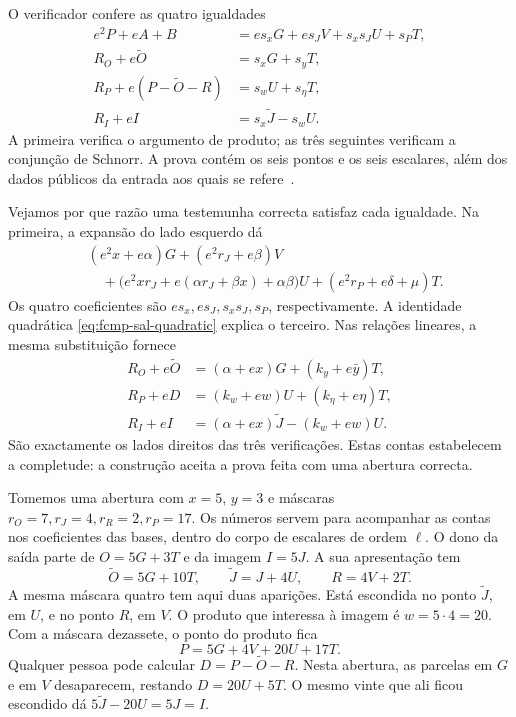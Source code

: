 O verificador confere as quatro igualdades
\begin{subequations}
\label{eq:fcmp-sal-verification}
\begin{align}
 e^2P+eA+B
   &=e s_xG+e s_JV+s_xs_JU+s_PT,
       \label{eq:fcmp-sal-product-check}\\
 R_O+e\widetilde O
   &=s_xG+s_yT,
       \label{eq:fcmp-sal-key-check}\\
 R_P+e(P-\widetilde O-R)
   &=s_wU+s_\eta T,
       \label{eq:fcmp-sal-difference-check}\\
 R_I+eI
   &=s_x\widetilde J-s_wU.
       \label{eq:fcmp-sal-image-check}
\end{align}
\end{subequations}
A primeira verifica o argumento de produto; as três seguintes
verificam a conjunção de Schnorr. A prova contém os seis pontos
e os seis escalares, além dos dados públicos da entrada aos quais
se refere~\cite{fcmp-composition-review,monero-oxide-fcmp-source}.

Vejamos por que razão uma testemunha correcta satisfaz cada
igualdade. Na primeira, a expansão do lado esquerdo dá
\[
 \begin{aligned}
 &(e^2x+e\alpha)G+(e^2r_J+e\beta)V\\
 &\quad+\bigl(e^2xr_J+e(\alpha r_J+\beta x)+\alpha\beta\bigr)U
       +(e^2r_P+e\delta+\mu)T.
 \end{aligned}
\]
Os quatro coeficientes são \(es_x,es_J,s_xs_J,s_P\),
respectivamente. A identidade quadrática
\eqref{eq:fcmp-sal-quadratic} explica o terceiro. Nas relações
lineares, a mesma substituição fornece
\[
 \begin{aligned}
 R_O+e\widetilde O
   &=(\alpha+ex)G+(k_y+e\bar y)T,\\
 R_P+eD
   &=(k_w+ew)U+(k_\eta+e\eta)T,\\
 R_I+eI
   &=(\alpha+ex)\widetilde J-(k_w+ew)U.
 \end{aligned}
\]
São exactamente os lados direitos das três verificações.
Estas contas estabelecem a completude: a construção aceita
a prova feita com uma abertura correcta.

Tomemos uma abertura com \(x=5\), \(y=3\) e máscaras
\(r_O=7,r_J=4,r_R=2,r_P=17\). Os números servem para acompanhar
as contas nos coeficientes das bases, dentro do corpo de escalares
de ordem \(\ell\). O dono da saída parte de
\(O=5G+3T\) e da imagem \(I=5J\). A sua apresentação tem
\[
 \widetilde O=5G+10T,\qquad \widetilde J=J+4U,
 \qquad R=4V+2T .
\]
A mesma máscara quatro tem aqui duas aparições. Está escondida no
ponto \(\widetilde J\), em \(U\), e no ponto \(R\), em \(V\).
O produto que interessa à imagem é \(w=5\cdot4=20\).
Com a máscara dezassete, o ponto do produto fica
\[
 P=5G+4V+20U+17T .
\]
Qualquer pessoa pode calcular \(D=P-\widetilde O-R\).
Nesta abertura, as parcelas em \(G\) e em \(V\) desaparecem,
restando \(D=20U+5T\). O mesmo vinte que ali ficou escondido dá
\(5\widetilde J-20U=5J=I\).

